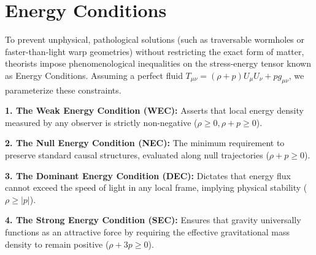 \documentclass[11pt, a4paper]{report}
\begin{document}
\section{Energy Conditions}
To prevent unphysical, pathological solutions (such as traversable wormholes or faster-than-light warp geometries) without restricting the exact form of matter, theorists impose phenomenological inequalities on the stress-energy tensor known as Energy Conditions. Assuming a perfect fluid $T_{\mu\nu} = (\rho + p)U_{\mu}U_{\nu} + p g_{\mu\nu}$, we parameterize these constraints.

\textbf{1. The Weak Energy Condition (WEC):} Asserts that local energy density measured by any observer is strictly non-negative ($\rho \ge 0, \rho + p \ge 0$).

\textbf{2. The Null Energy Condition (NEC):} The minimum requirement to preserve standard causal structures, evaluated along null trajectories ($\rho + p \ge 0$).

\textbf{3. The Dominant Energy Condition (DEC):} Dictates that energy flux cannot exceed the speed of light in any local frame, implying physical stability ($\rho \ge |p|$).

\textbf{4. The Strong Energy Condition (SEC):} Ensures that gravity universally functions as an attractive force by requiring the effective gravitational mass density to remain positive ($\rho + 3p \ge 0$).
\end{document}
